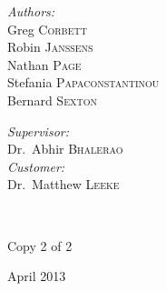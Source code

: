 \documentclass[11pt,english,twoside,openright]{report}
\begin{document}
\begin{titlepage}
\begin{center}
\begin{minipage}{0.4\textwidth}
\begin{flushleft} \large
\emph{Authors:}\\
Greg \textsc{Corbett}\\
Robin \textsc{Janssens}\\
Nathan \textsc{Page}\\
Stefania \textsc{Papaconstantinou}\\
Bernard \textsc{Sexton}\\
\end{flushleft}
\end{minipage}
\begin{minipage}{0.4\textwidth}
\begin{flushright} \large
\emph{Supervisor:} \\
Dr.~Abhir \textsc{Bhalerao}\\
\emph{Customer:} \\
Dr.~Matthew \textsc{Leeke}\\
\end{flushright}
\end{minipage}\\
\begin{center}
Copy 2 of 2\\
\end{center}

\vfill

{\large April 2013}

\end{center}

\end{titlepage}


\newpage
\thispagestyle{empty}
\mbox{}


\newpage

\newpage
\thispagestyle{empty}
\mbox{}


\newpage

\newpage
\thispagestyle{empty}
\mbox{}

\newpage
\thispagestyle{empty}
\mbox{}

\setcounter{page}{1}
\tableofcontents
\newpage

\listoffigures
\newpage

\listoftables
\cleardoublepage


\cleardoublepage


\cleardoublepage
\end{document}
